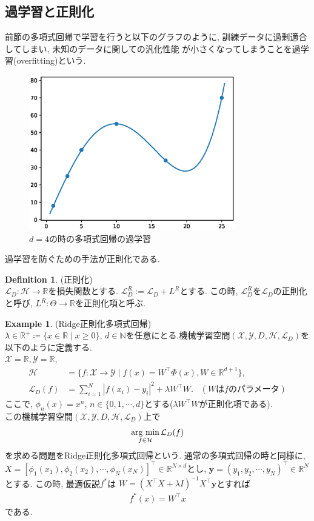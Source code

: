 \documentclass[11pt, a4paper, dvipdfmx]{jsarticle}
\theoremstyle{definition}
\newtheorem{Definition+}[Axiom+]{Definition}
\newtheorem{Example+}[Axiom+]{Example}
\newcommand{\N}{\mathbb{N}}
\newcommand{\R}{\mathbb{R}}
\newcommand{\X}{\mathcal{X}}
\newcommand{\Y}{\mathcal{Y}}
\newcommand{\Hil}{\mathcal{H}}
\newcommand{\Loss}{\mathcal{L}_{D}}
\newcommand{\MLsp}{(\X, \Y, D, \Hil, \Loss)}
\newcommand{\argmin}{\mathop{\rm arg~min}\limits}
\begin{document}
\subsection{過学習と正則化}
前節の多項式回帰で学習を行うと以下のグラフのように, 訓練データに過剰適合してしまい, 未知のデータに関しての汎化性能
が小さくなってしまうことを過学習(overfitting)という. 
\begin{figure}[H]
    \centering
    \includegraphics[width = 9.0cm]{Images/overfitting_PR.eps}
    \caption{$d = 4$の時の多項式回帰の過学習}
\end{figure}
過学習を防ぐための手法が正則化である.
\begin{Definition+}(正則化)\\
    $\Loss:\Hil\to\R$を損失関数とする. $\Loss^{R} := \Loss + L^{R}$とする.
    この時, $\Loss^{R}$を$\Loss$の正則化と呼び, $L^R:\Theta\to\R$を正則化項と呼ぶ.
\end{Definition+}
\begin{Example+}(Ridge正則化多項式回帰)\\
    $\lambda\in\R^{+}\coloneqq\{x\in\R\mid x\geq0\}$, $d\in\N$を任意にとる.機械学習空間$\MLsp$を以下のように定義する.\\
    $\X = \R, \Y = \R$, 
    \begin{align*}
        \Hil &= \{f:\X\to\Y\mid f(x) = W^{\top}\Phi(x), W\in\R^{d + 1}\},\\
        \Loss(f) &= \sum_{i = 1}^{N}|f(x_i) - y_i|^2+\lambda W^\top W.\hspace{10pt}　(W\text{は$f$のパラメータ})
    \end{align*}
    ここで, $\phi_{n}(x) = x^{n}$, $n\in\{0, 1, \cdots, d\}$とする($\lambda W^{\top}W$が正則化項である).\\
    この機械学習空間$\MLsp$上で
    \begin{align*}
        \argmin_{f\in\Hil}\Loss(f)
    \end{align*}
    を求める問題をRidge正則化多項式回帰という. 通常の多項式回帰の時と同様に, $X = [\phi_{1}(x_1), \phi_{2}(x_{2}), \cdots, \phi_{N}(x_N)]^{\top}\in\R^{N\times d}$とし, 
    $\mathbf{y} = (y_{1}, y_{2}, \cdots, y_{N})^{\top}\in\R^{N}$とする. この時, 最適仮説$f^{*}$は
    $W = (X^\top X + \lambda I)^{-1}X^\top\mathbf{y}$とすれば
    \begin{align*}
        f^{*}(x) = W^{\top}x
    \end{align*}
    である. 
\end{Example+}
\end{document}
